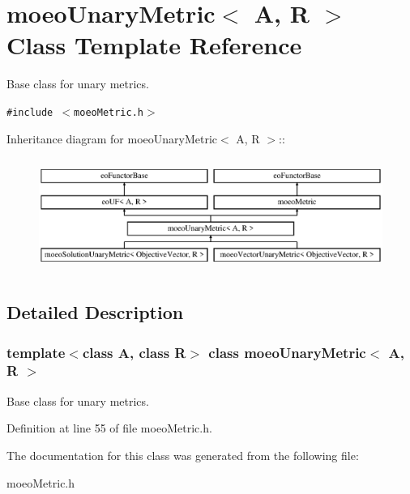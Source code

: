\section{moeo\-Unary\-Metric$<$ A, R $>$ Class Template Reference}
\label{classmoeoUnaryMetric}
Base class for unary metrics.  


{\tt \#include $<$moeo\-Metric.h$>$}

Inheritance diagram for moeo\-Unary\-Metric$<$ A, R $>$::\begin{figure}[H]
\begin{center}
\leavevmode
\includegraphics[height=3.75839cm]{classmoeoUnaryMetric}
\end{center}
\end{figure}


\subsection{Detailed Description}
\subsubsection*{template$<$class A, class R$>$ class moeo\-Unary\-Metric$<$ A, R $>$}

Base class for unary metrics. 



Definition at line 55 of file moeo\-Metric.h.

The documentation for this class was generated from the following file:\begin{CompactItemize}
\item 
moeo\-Metric.h\end{CompactItemize}
